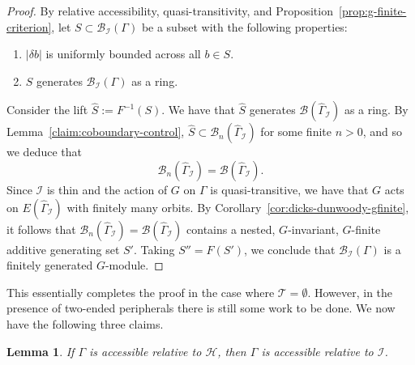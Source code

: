 \documentclass[11pt,a4paper]{amsart}
\newtheorem{lemma}[theorem]{Lemma}
\theoremstyle{definition}
\newcommand{\per}{\mathcal{H}}
\newcommand{\br}{{\mathscr{B}}}
\begin{document}
    \begin{proof}
        By relative accessibility, quasi-transitivity, and Proposition~\ref{prop:g-finite-criterion}, let $S \subset \br_{\mathcal I}(\Gamma)$ be a subset with the following properties:
        \begin{enumerate}
            \item $|\delta b|$ is uniformly bounded across all $b \in S$.

            \item $S$ generates $ \br_{\mathcal I}(\Gamma)$ as a ring.
        \end{enumerate}
        Consider the lift $\widehat S := F^{-1}(S)$. We have that $\widehat S$ generates $\br(\widehat\Gamma_{\mathcal I})$ as a ring. By Lemma~\ref{claim:coboundary-control}, $\widehat S \subset  \br_n(\widehat\Gamma_{\mathcal I})$ for some finite $n > 0$, and so we deduce that
        $$
        \br_n(\widehat\Gamma_{\mathcal I}) =  \br(\widehat\Gamma_{\mathcal I}).
        $$
        Since $\mathcal I$ is thin and the action of $G$ on $\Gamma$ is quasi-transitive, we have that $G$ acts on $E(\widehat \Gamma_{\mathcal I})$ with finitely many orbits. By Corollary~\ref{cor:dicks-dunwoody-gfinite}, it follows that  $\br_n(\widehat\Gamma_{\mathcal I}) =  \br(\widehat\Gamma_{\mathcal I})$ contains a nested, $G$-invariant, $G$-finite additive generating set $S'$. Taking $S'' = F(S')$, we conclude that $\br_{\mathcal I}(\Gamma)$ is a finitely generated $G$-module. 
    \end{proof}

    This essentially completes the proof in the case where $\mathcal T = \emptyset$. However, in the presence of two-ended peripherals there is still some work to be done.
    We now have the following three claims.

    \begin{lemma}\label{claim:acc-H-implies-acc-I}
        If $\Gamma$ is accessible relative to $\per$, then $\Gamma$ is accessible relative to $\mathcal I$.
    \end{lemma}
\end{document}
